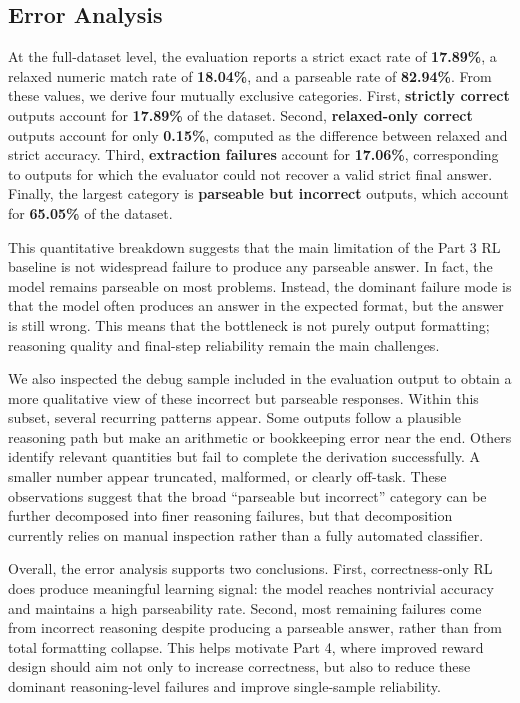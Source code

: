 \subsection{Error Analysis}
At the full-dataset level, the evaluation reports a strict exact rate of \textbf{17.89\%}, a relaxed numeric match rate of \textbf{18.04\%}, and a parseable rate of \textbf{82.94\%}. From these values, we derive four mutually exclusive categories. First, \textbf{strictly correct} outputs account for \textbf{17.89\%} of the dataset. Second, \textbf{relaxed-only correct} outputs account for only \textbf{0.15\%}, computed as the difference between relaxed and strict accuracy. Third, \textbf{extraction failures} account for \textbf{17.06\%}, corresponding to outputs for which the evaluator could not recover a valid strict final answer. Finally, the largest category is \textbf{parseable but incorrect} outputs, which account for \textbf{65.05\%} of the dataset.

This quantitative breakdown suggests that the main limitation of the Part 3 RL baseline is not widespread failure to produce any parseable answer. In fact, the model remains parseable on most problems. Instead, the dominant failure mode is that the model often produces an answer in the expected format, but the answer is still wrong. This means that the bottleneck is not purely output formatting; reasoning quality and final-step reliability remain the main challenges.

We also inspected the debug sample included in the evaluation output to obtain a more qualitative view of these incorrect but parseable responses. Within this subset, several recurring patterns appear. Some outputs follow a plausible reasoning path but make an arithmetic or bookkeeping error near the end. Others identify relevant quantities but fail to complete the derivation successfully. A smaller number appear truncated, malformed, or clearly off-task. These observations suggest that the broad ``parseable but incorrect'' category can be further decomposed into finer reasoning failures, but that decomposition currently relies on manual inspection rather than a fully automated classifier.

Overall, the error analysis supports two conclusions. First, correctness-only RL does produce meaningful learning signal: the model reaches nontrivial accuracy and maintains a high parseability rate. Second, most remaining failures come from incorrect reasoning despite producing a parseable answer, rather than from total formatting collapse. This helps motivate Part 4, where improved reward design should aim not only to increase correctness, but also to reduce these dominant reasoning-level failures and improve single-sample reliability.

